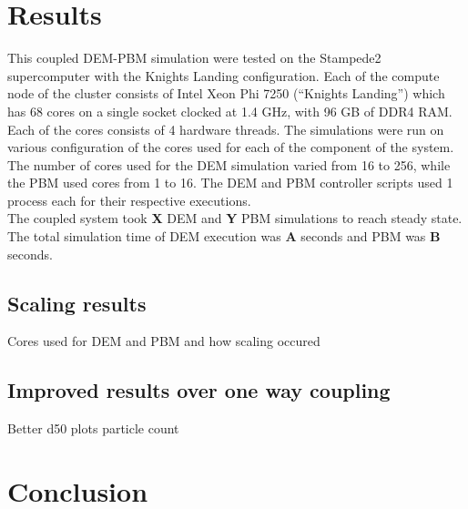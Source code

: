 \documentclass[fleqn,twoside,10pt]{article}
\begin{document}

\section{Results}
\label{results}
This coupled DEM-PBM simulation were tested on the Stampede2 supercomputer with the Knights Landing 
configuration. Each of the compute node of the cluster consists of Intel Xeon Phi 7250 
(\textquotedblleft Knights Landing\textquotedblright) which has 68 cores on a single socket 
clocked at 1.4 GHz, with 96 GB of DDR4 RAM. Each of the cores consists of 4 hardware threads. 
The simulations were run on various configuration of the cores used for each of the 
component of the system. The number of cores used for the DEM simulation varied from 16 to 256, 
while the PBM used cores from 1 to 16. The DEM and PBM controller scripts used 1 process each for 
their respective executions.\\
The coupled system took \textbf{X} DEM and \textbf{Y} PBM simulations to reach steady state. The 
total simulation time of DEM execution was \textbf{A} seconds and PBM was \textbf{B} seconds. 

\subsection{Scaling results}
Cores used for DEM and PBM and how scaling occured
\subsection{Improved results over one way coupling}
Better d50 plots particle count
\section{Conclusion}



\end{document}
